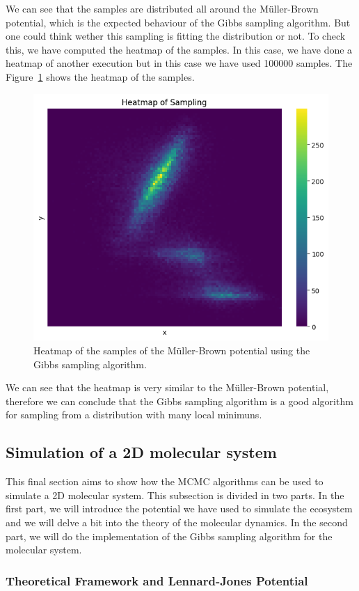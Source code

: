 \documentclass{article}
\begin{document}
We can see that the samples are distributed all around the Müller-Brown potential, which is the expected behaviour of the Gibbs sampling algorithm. But one could think wether this sampling is fitting the distribution or not. To check this, we have computed the heatmap of the samples. In this case, we have done a heatmap of another execution but in this case we have used 100000 samples. The Figure~\ref{fig:mullerbrownheatmap} shows the heatmap of the samples.

\begin{figure}[H]
	\centering
	\includegraphics[width=0.5\linewidth]{./Figures/MCMC/mullerbrowngibbsheat.png}
	\caption{Heatmap of the samples of the Müller-Brown potential using the Gibbs sampling algorithm.}
	\label{fig:mullerbrownheatmap}
\end{figure}

We can see that the heatmap is very similar to the Müller-Brown potential, therefore we can conclude that the Gibbs sampling algorithm is a good algorithm for sampling from a distribution with many local minimuns.



\subsection{Simulation of a 2D molecular system}

This final section aims to show how the MCMC algorithms can be used to simulate a 2D molecular system. This subsection is divided in two parts. In the first part, we will introduce the potential we have used to simulate the ecosystem and we will delve a bit into the theory of the molecular dynamics. In the second part, we will do the implementation of the Gibbs sampling algorithm for the molecular system.

\subsubsection{Theoretical Framework and Lennard-Jones Potential}
\end{document}
